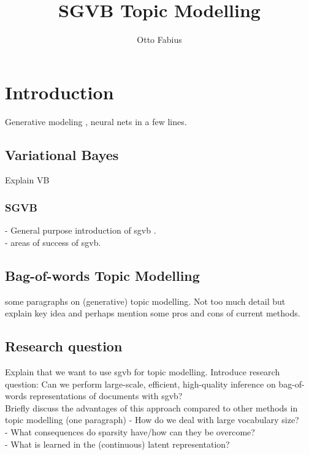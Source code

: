 \documentclass{report}
\author{Otto Fabius}
\title{SGVB Topic Modelling}
\begin{document}
\maketitle
\tableofcontents
\chapter{Introduction}

Generative modeling , neural nets in a few lines.




\section{Variational Bayes}

Explain VB

\subsection{SGVB}

- General purpose introduction of sgvb . \\

- areas of success of sgvb.

\section{Bag-of-words Topic Modelling}
some paragraphs on (generative) topic modelling. 
Not too much detail but explain key idea and perhaps mention some pros and cons of current methods. 
\section{Research question}
Explain that we want to use sgvb for topic modelling. Introduce research question:
Can we perform large-scale, efficient, high-quality inference on bag-of-words representations of documents with sgvb? \\
Briefly discuss the advantages of this approach compared to other methods in topic modelling (one paragraph)
-	How do we deal with large vocabulary size?\\
-	What consequences do sparsity have/how can they be overcome? \\
-	What is learned in the (continuous) latent representation?
\end{document}
